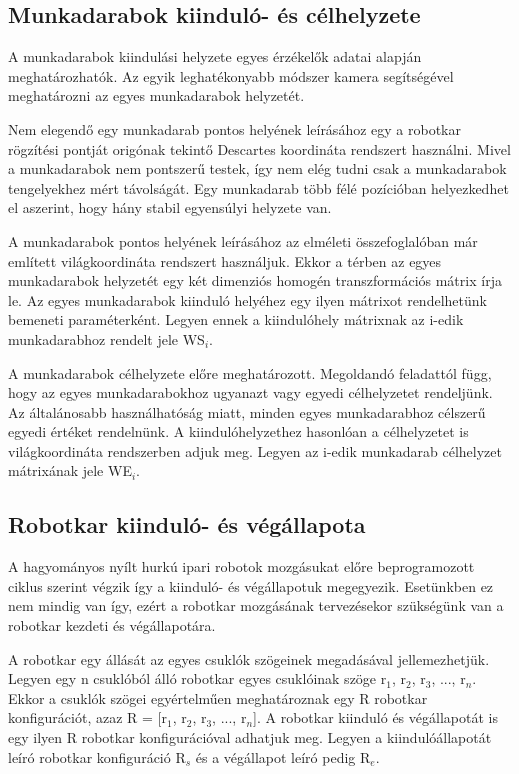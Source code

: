 \subsection{Munkadarabok kiinduló- és célhelyzete}

A munkadarabok kiindulási helyzete egyes érzékelők adatai alapján meghatározhatók. Az egyik leghatékonyabb módszer kamera segítségével meghatározni az egyes munkadarabok helyzetét.

Nem elegendő egy munkadarab pontos helyének leírásához egy a robotkar rögzítési pontját origónak tekintő Descartes koordináta rendszert használni. Mivel a munkadarabok nem pontszerű testek, így nem elég tudni csak a munkadarabok tengelyekhez mért távolságát. Egy munkadarab több félé pozícióban helyezkedhet el aszerint, hogy hány stabil egyensúlyi helyzete van.

A munkadarabok pontos helyének leírásához az elméleti összefoglalóban már említett világkoordináta rendszert használjuk. Ekkor a térben az egyes munkadarabok helyzetét egy két dimenziós homogén transzformációs mátrix írja le. Az egyes munkadarabok kiinduló helyéhez egy ilyen mátrixot rendelhetünk bemeneti paraméterként. Legyen ennek a kiindulóhely mátrixnak az i-edik munkadarabhoz rendelt jele WS$_i$.

A munkadarabok célhelyzete előre meghatározott. Megoldandó feladattól függ, hogy az egyes munkadarabokhoz ugyanazt vagy egyedi célhelyzetet rendeljünk. Az általánosabb használhatóság miatt, minden egyes munkadarabhoz célszerű egyedi értéket rendelnünk. A kiindulóhelyzethez hasonlóan a célhelyzetet is világkoordináta rendszerben adjuk meg. Legyen az i-edik munkadarab célhelyzet mátrixának jele WE$_i$.


\subsection{Robotkar kiinduló- és végállapota}

A hagyományos nyílt hurkú ipari robotok mozgásukat előre beprogramozott ciklus szerint végzik így a kiinduló- és végállapotuk megegyezik. Esetünkben ez nem mindig van így, ezért a robotkar mozgásának tervezésekor szükségünk van a robotkar kezdeti és végállapotára. 

A robotkar egy állását az egyes csuklók szögeinek megadásával jellemezhetjük. Legyen egy n csuklóból álló robotkar egyes csuklóinak szöge r$_1$, r$_2$, r$_3$, ..., r$_n$. Ekkor a csuklók szögei egyértelműen meghatároznak egy R robotkar konfigurációt, azaz R = [r$_1$, r$_2$, r$_3$, ..., r$_n$]. A robotkar kiinduló és végállapotát is egy ilyen R robotkar konfigurációval adhatjuk meg. Legyen a kiindulóállapotát leíró robotkar konfiguráció R$_s$ és a végállapot leíró pedig R$_e$.

